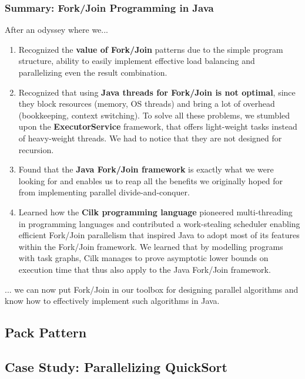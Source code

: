 \documentclass[main.tex]{subfiles}
\begin{document}
\subsubsection{Summary: Fork/Join Programming in Java}
After an odyssey where we...
\begin{enumerate}
  \item Recognized the \textbf{value of Fork/Join} patterns due to the simple program structure, ability to easily implement effective load balancing and parallelizing even the result combination.
  \item Recognized that using \textbf{Java threads for Fork/Join is not optimal}, since they block resources (memory, OS threads) and bring a lot of overhead (bookkeeping, context switching). To solve all these problems, we stumbled upon the \textbf{ExecutorService} framework, that offers light-weight tasks instead of heavy-weight threads. We had to notice that they are not designed for recursion.
  \item Found that the \textbf{Java Fork/Join framework} is exactly what we were looking for and enables us to reap all the benefits we originally hoped for from implementing parallel divide-and-conquer.
  \item Learned how the \textbf{Cilk programming language} pioneered multi-threading in programming languages and contributed a work-stealing scheduler enabling efficient Fork/Join parallelism that inspired Java to adopt most of its features within the Fork/Join framework. We learned that by modelling programs with task graphs, Cilk manages to prove asymptotic lower bounds on execution time that thus also apply to the Java Fork/Join framework.
\end{enumerate}
... we can now put Fork/Join in our toolbox for designing parallel algorithms and know how to effectively implement such algorithms in Java.

\subsection{Pack Pattern}


\subsection{Case Study: Parallelizing QuickSort}
\end{document}

